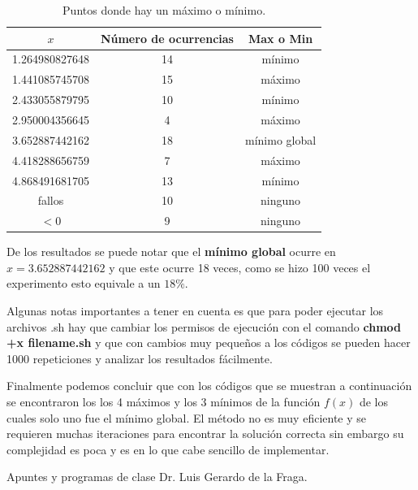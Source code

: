 \documentclass[10pt,a4paper]{article}
\begin{document}
\begin{table}[!hbp]                                 
		\centering                                       
		\begin{tabular}{ccc}
			\hline                                             
			$x$ & Número de ocurrencias & Max o Min \\                     
			\hline 
			1.264980827648 & 14	& mínimo\\                                            
			1.441085745708 & 15	& máximo\\
			2.433055879795 & 10	& mínimo\\
			2.950004356645 & 4	& máximo\\
			3.652887442162 & 18	& mínimo global\\
			4.418288656759 & 7	& máximo\\
			4.868491681705 & 13	& mínimo\\
			fallos         & 10	& ninguno\\
			$<0$		   & 9	& ninguno\\
			\hline                                             
		\end{tabular}
		\caption{Puntos donde hay un máximo o mínimo.}                                                                                  
	\end{table}	

De los resultados se puede notar que el \textbf{mínimo global} ocurre en $x = 3.652887442162$ y que este ocurre 18 veces, como se hizo 100 veces el experimento esto equivale a un $18\%$.

Algunas notas importantes a tener en cuenta es que para poder ejecutar los archivos .sh hay que cambiar los permisos de ejecución con el comando \textbf{chmod +x filename.sh} y que con cambios muy pequeños a los códigos se pueden hacer 1000 repeticiones y analizar los resultados fácilmente. 

Finalmente podemos concluir que con los códigos que se muestran a continuación se encontraron los los 4 máximos y los 3 mínimos de la función $f(x)$ de los cuales solo uno fue el mínimo global. El método no es muy eficiente y se requieren muchas iteraciones para encontrar la solución correcta sin embargo su complejidad es poca y es en lo que cabe sencillo de implementar.


\newpage








\begin{thebibliography}{99}
 Apuntes y programas de clase Dr. Luis Gerardo de la Fraga.
\end{thebibliography}
\end{document}
